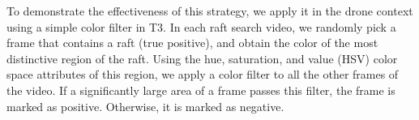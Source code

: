 
To demonstrate the effectiveness of this strategy, we apply it in the drone
context using a simple color filter in T3. In each raft search video, we
randomly pick a frame that contains a raft (true positive), and obtain the color
of the most distinctive region of the raft. Using the hue, saturation, and value
(HSV) color space attributes of this region, we apply a color filter to all the
other frames of the video. If a significantly large area of a frame passes this
filter, the frame is marked as positive. Otherwise, it is marked as negative.

